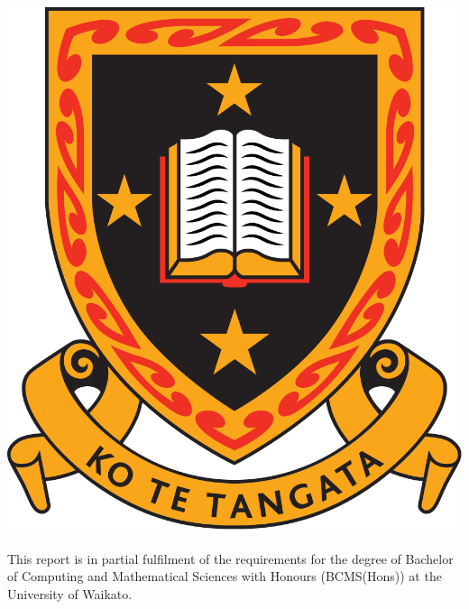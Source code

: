 \begin{titlepage}
\begin{center}

\includegraphics[width=0.35\linewidth]{waikatoLogoBig}

This report is in partial fulfilment of the requirements for the degree of
Bachelor of Computing and Mathematical Sciences with Honours
(BCMS(Hons)) at the University of Waikato.

\end{center}




 

\end{titlepage}
\clearpage